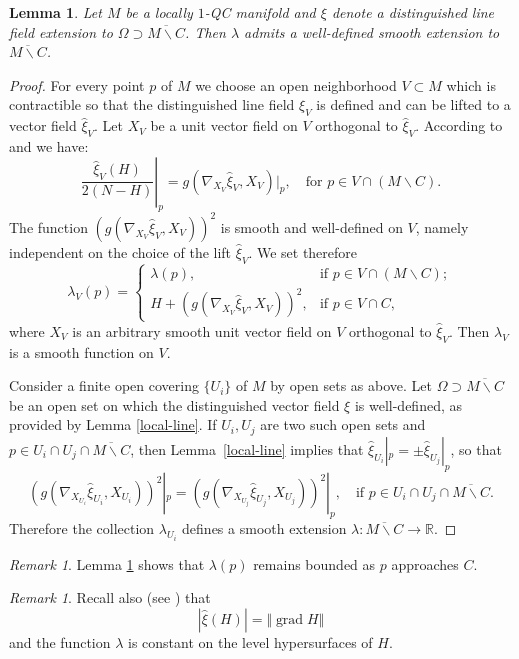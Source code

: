\documentclass[10pt]{amsart}
\let\moins\smallsetminus
\DeclareMathOperator{\grad}{grad}
\let\parallel\Vert
\newtheorem{lemma}[theorem]{Lemma}
\theoremstyle{definition}
\theoremstyle{remark}
\newtheorem{remark}[theorem]{Remark}
\numberwithin{equation}{section}
\newcommand{\RR}{\mathbb R}
\begin{document}
\begin{lemma}\label{extension-lambda}
Let $M$ be a locally $1$-QC manifold and $\xi$ denote a distinguished line field extension to $\Omega\supset \overline{M\moins C}$.
Then $\lambda$ admits a well-defined smooth extension to $\overline{M\moins C}$.
\end{lemma}
\begin{proof}
For every point $p$ of $M$ we choose an open neighborhood $V\subset M$ which is contractible so that
the distinguished line field $\xi_V$ is defined and can be lifted to a vector field $\widehat{\xi}_V$.
Let $X_V$ be a unit vector field on $V$ orthogonal to $\widehat{\xi}_V$.
According to \hbox{\cite[(3.11)]{BP}} and \cite[(3.5)]{GM} we have:
\[\left.\frac{\widehat{\xi}_V(H)}{2(N-H)}\right|_p= g(\nabla_{X_V}\widehat{\xi}_V, X_V)|_p, \quad\text{for } p\in V\cap (M\moins C).\]
The function $(g(\nabla_{X_V}\widehat{\xi}_V, X_V))^2$ is smooth and well-defined on $V$, namely independent on the choice of the lift $\widehat{\xi}_V$. We set therefore
\[\lambda_V(p)=\begin{cases}
\lambda(p), &\text{if } p\in V\cap (M\moins C);\\
H+(g(\nabla_{X_V}\widehat{\xi}_V, X_V))^2, &\text{if } p\in V\cap C,
\end{cases}\]
where $X_V$ is an arbitrary smooth unit vector field on $V$ orthogonal to $\widehat{\xi}_V$.
Then $\lambda_V$ is a smooth function on $V$.

Consider a finite open covering $\{U_i\}$ of $M$ by open sets as above. Let $\Omega\supset \overline{M\moins C}$ be an
open set on which the distinguished vector field $\xi$ is well-defined, as provided by Lemma \ref{local-line}.
If $U_i,U_j$ are two such open sets and $p\in U_i\cap U_j\cap \overline{M\moins C}$, then Lemma~\ref{local-line} implies that
$\widehat{\xi}_{U_i}|_p=\pm\widehat{\xi}_{U_j}|_p$, so that
\[ (g(\nabla_{X_{U_i}}\widehat{\xi}_{U_i}, X_{U_i}))^2|_p= (g(\nabla_{X_{U_j}}\widehat{\xi}_{U_j}, X_{U_j}))^2|_p, \quad\text{if } p\in U_i\cap U_j \cap \overline{M\moins C}.\]
Therefore
the collection $\lambda_{U_i}$ defines a smooth extension $\lambda:\overline{M\moins C}\to \RR$.
\end{proof}
\begin{remark}
Lemma \ref{extension-lambda} shows that $\lambda(p)$ remains bounded
as $p$ approaches $C$.
\end{remark}

\begin{remark}
Recall also (see \cite{BP,GM}) that
\[ |\widehat{\xi}(H)|=\parallel \grad H\parallel \]
and the function $\lambda$ is constant on the
level hypersurfaces of $H$.
\end{remark}
\end{document}
